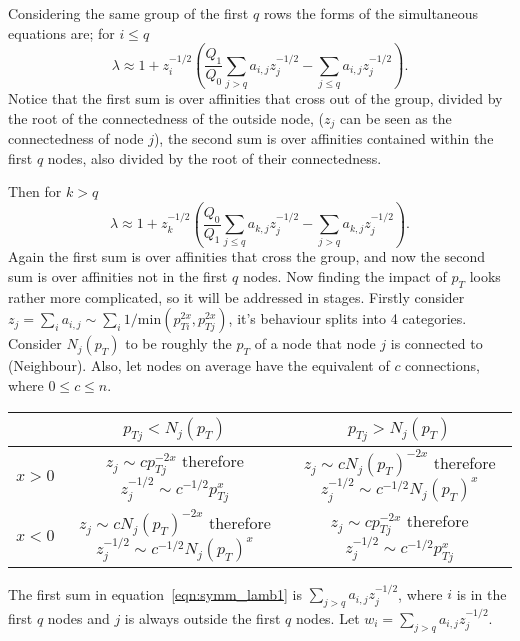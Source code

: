 Considering the same group of the first \(q\) rows the forms of the simultaneous equations are;
for \(i \leq q\)
\begin{equation}\label{eqn:symm_lamb1}
\lambda \approx 1 + z_i^{-1/2} \left(\frac{Q_1}{Q_0}\sum_{j>q}a_{i,j}z_j^{-1/2} - \sum_{j \leq q} a_{i,j}z_j^{-1/2}\right).
\end{equation}
Notice that the first sum is over affinities that cross out of the group, divided by the root of the connectedness of the outside node,
(\(z_j\) can be seen as the connectedness of node \(j\)), the second sum is over affinities contained within the first \(q\) nodes,
also divided by the root of their connectedness.

Then for \(k > q\)
\begin{equation} \lambda \approx 1 + z_k^{-1/2} \left(\frac{Q_0}{Q_1}\sum_{j\leq q}a_{k,j}z_j^{-1/2} - \sum_{j > q} a_{k,j}z_j^{-1/2}\right).\end{equation}
Again the first sum is over affinities that cross the group, and now the second sum is over affinities not in the first \(q\) nodes.
Now finding the impact of \(p_T\) looks rather more complicated,
so it will be addressed in stages.
Firstly consider \(z_j = \sum_i a_{i,j} \sim \sum_i 1/\text{min}(p_{Ti}^{2x}, p_{Tj}^{2x}) \),
it's behaviour splits into 4 categories.
Consider \(N_j(p_T)\) to be roughly the \(p_T\) of a node that node \(j\) is connected to (Neighbour).
Also, let nodes on average have the equivalent of \(c\) connections, where \(0 \leq c \leq n\).
\begin{center}  %
    \begin{tabular}{c | c c}
                & \(p_{Tj} < N_j(p_T)\) & \(p_{Tj} > N_j(p_T)\) \\
        \hline
        \(x>0\) & \(z_j \sim cp_{Tj}^{-2x}\) therefore \(z_j^{-1/2} \sim c^{-1/2} p_{Tj}^{x}\) & \(z_j \sim cN_j(p_T)^{-2x}\) therefore \(z_j^{-1/2} \sim c^{-1/2}N_j(p_T)^{x}\)\\
        \(x<0\) & \(z_j \sim cN_j(p_T)^{-2x}\) therefore \(z_j^{-1/2} \sim c^{-1/2}N_j(p_T)^{x}\) & \(z_j \sim cp_{Tj}^{-2x}\) therefore \(z_j^{-1/2} \sim c^{-1/2} p_{Tj}^{x}\)\\
    \end{tabular}
\end{center}
The first sum in equation~\ref{eqn:symm_lamb1} is \(\sum_{j>q}a_{i,j} z_j^{-1/2}\),
where \(i\) is in the first \(q\) nodes and \(j\) is always outside the first \(q\) nodes.
Let \(w_{i} = \sum_{j>q}a_{i,j} z_j^{-1/2}\).
